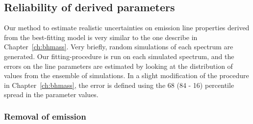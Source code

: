 \subsection{Reliability of derived parameters}

Our method to estimate realistic uncertainties on emission line properties derived from the best-fitting model is very similar to the one describe in Chapter~\ref{ch:bhmass}. 
Very briefly, random simulations of each spectrum are generated.
Our fitting-procedure is run on each simulated spectrum, and the errors on the line parameters are estimated by looking at the distribution of values from the ensemble of simulations. 
In a slight modification of the procedure in Chapter~\ref{ch:bhmass}, the error is defined using the 68 (84 - 16) percentile spread in the parameter values. 

\subsubsection{Removal of  emission}


